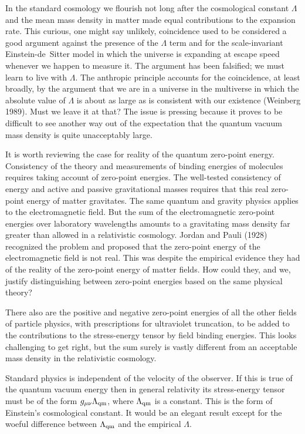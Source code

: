 \documentclass[fleqn,usenatbib]{mnras}
\begin{document}
In the standard cosmology we flourish not long after the cosmological constant $\Lambda$ and the mean mass density in matter made equal contributions to the expansion rate. This curious, one might say unlikely, coincidence used to be considered a good argument against the presence of the $\Lambda$ term and for the scale-invariant Einstein-de~Sitter model in which the universe is expanding at escape speed whenever we happen to measure it. The argument has been falsified; we must learn to live with $\Lambda$. The anthropic principle accounts for the coincidence, at least broadly, by the argument that we are in a universe in the multiverse in which the absolute value of $\Lambda$ is about as large as is consistent with our existence (Weinberg 1989). Must we leave it at that? The issue is pressing because it proves to be difficult to see another way out of the expectation that the quantum vacuum mass density is quite unacceptably large.

It is worth reviewing the case for reality of the quantum zero-point energy. Consistency of the theory and measurements of binding energies of molecules requires taking account of zero-point energies. The well-tested consistency of energy and active and passive gravitational masses requires that this real zero-point energy of  matter gravitates. The same quantum and gravity physics applies to the electromagnetic field. But the sum of the electromagnetic zero-point energies over laboratory wavelengths amounts to a gravitating mass density far greater than allowed in a relativistic cosmology. Jordan and Pauli (1928) recognized the problem and proposed that the zero-point energy of the electromagnetic field is not real. This was despite the empirical evidence they had of the reality of the zero-point energy of matter fields. How could they, and we, justify distinguishing between zero-point energies based on the same physical theory? 

There also are the positive and negative zero-point energies of all the other fields of particle physics, with prescriptions for ultraviolet truncation, to be added to the contributions to the stress-energy tensor by field binding energies. This looks  challenging to get right, but the sum surely is vastly different from an acceptable mass density in the relativistic cosmology.

Standard physics is independent of the velocity of the observer. If this is true of the quantum vacuum energy then in general relativity its stress-energy tensor must be of the form $g_{\mu\nu}\Lambda_{\rm qm}$, where $\Lambda_{\rm qm}$ is a constant. This is the form of Einstein's cosmological constant. It would be an elegant result except for the woeful difference between $\Lambda_{\rm qm}$ and the empirical $\Lambda$. 
\end{document}
